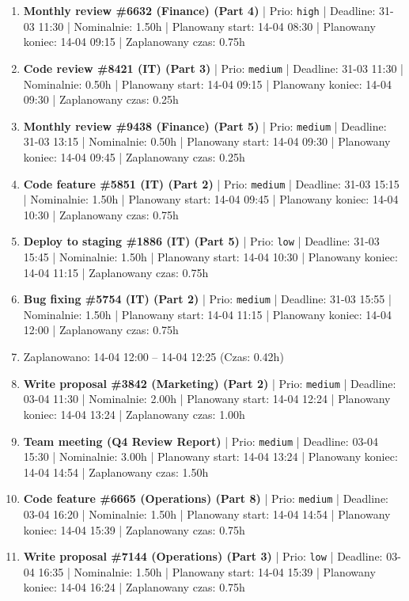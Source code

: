 {\begin{enumerate}
  \item [\textbf{14615}] \textbf{Monthly review \#6632 (Finance) (Part 4)} | Prio: \texttt{high} | Deadline: 31-03 11:30 | Nominalnie: 1.50h | Planowany start: 14-04 08:30 | Planowany koniec: 14-04 09:15 | Zaplanowany czas: 0.75h
  \item [\textbf{14665}] \textbf{Code review \#8421 (IT) (Part 3)} | Prio: \texttt{medium} | Deadline: 31-03 11:30 | Nominalnie: 0.50h | Planowany start: 14-04 09:15 | Planowany koniec: 14-04 09:30 | Zaplanowany czas: 0.25h
  \item [\textbf{14656}] \textbf{Monthly review \#9438 (Finance) (Part 5)} | Prio: \texttt{medium} | Deadline: 31-03 13:15 | Nominalnie: 0.50h | Planowany start: 14-04 09:30 | Planowany koniec: 14-04 09:45 | Zaplanowany czas: 0.25h
  \item [\textbf{14643}] \textbf{Code feature \#5851 (IT) (Part 2)} | Prio: \texttt{medium} | Deadline: 31-03 15:15 | Nominalnie: 1.50h | Planowany start: 14-04 09:45 | Planowany koniec: 14-04 10:30 | Zaplanowany czas: 0.75h
  \item [\textbf{14697}] \textbf{Deploy to staging \#1886 (IT) (Part 5)} | Prio: \texttt{low} | Deadline: 31-03 15:45 | Nominalnie: 1.50h | Planowany start: 14-04 10:30 | Planowany koniec: 14-04 11:15 | Zaplanowany czas: 0.75h
  \item [\textbf{14631}] \textbf{Bug fixing \#5754 (IT) (Part 2)} | Prio: \texttt{medium} | Deadline: 31-03 15:55 | Nominalnie: 1.50h | Planowany start: 14-04 11:15 | Planowany koniec: 14-04 12:00 | Zaplanowany czas: 0.75h
  \item [\textbf{PRZERWA}] Zaplanowano: 14-04 12:00 -- 14-04 12:25 (Czas: 0.42h)
  \item [\textbf{14673}] \textbf{Write proposal \#3842 (Marketing) (Part 2)} | Prio: \texttt{medium} | Deadline: 03-04 11:30 | Nominalnie: 2.00h | Planowany start: 14-04 12:24 | Planowany koniec: 14-04 13:24 | Zaplanowany czas: 1.00h
  \item [\textbf{14635}] \textbf{Team meeting (Q4 Review Report)} | Prio: \texttt{medium} | Deadline: 03-04 15:30 | Nominalnie: 3.00h | Planowany start: 14-04 13:24 | Planowany koniec: 14-04 14:54 | Zaplanowany czas: 1.50h
  \item [\textbf{14667}] \textbf{Code feature \#6665 (Operations) (Part 8)} | Prio: \texttt{medium} | Deadline: 03-04 16:20 | Nominalnie: 1.50h | Planowany start: 14-04 14:54 | Planowany koniec: 14-04 15:39 | Zaplanowany czas: 0.75h
  \item [\textbf{14702}] \textbf{Write proposal \#7144 (Operations) (Part 3)} | Prio: \texttt{low} | Deadline: 03-04 16:35 | Nominalnie: 1.50h | Planowany start: 14-04 15:39 | Planowany koniec: 14-04 16:24 | Zaplanowany czas: 0.75h

\end{enumerate}}
